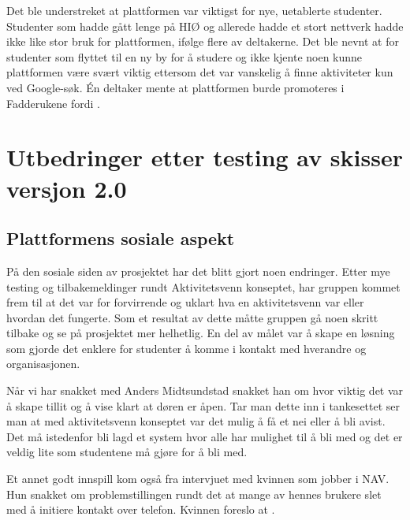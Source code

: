 Det ble understreket at plattformen var viktigst for nye, uetablerte studenter. Studenter som hadde gått lenge på HIØ og allerede hadde et stort nettverk hadde ikke like stor bruk for plattformen, ifølge flere av deltakerne. Det ble nevnt at for studenter som flyttet til en ny by for å studere og ikke kjente noen kunne plattformen være svært viktig ettersom det var vanskelig å finne aktiviteter kun ved Google-søk. Én deltaker mente at plattformen burde promoteres i Fadderukene fordi . 


\section{Utbedringer etter testing av skisser versjon 2.0}
\label{section:utbedringer-2.0}

\subsection{Plattformens sosiale aspekt}

På den sosiale siden av prosjektet har det blitt gjort noen endringer. Etter mye testing og tilbakemeldinger rundt Aktivitetsvenn konseptet, har gruppen kommet frem til at det var for forvirrende og uklart hva en aktivitetsvenn var eller hvordan det fungerte. Som et resultat av dette måtte gruppen gå noen skritt tilbake og se på prosjektet mer helhetlig. En del av målet var å  skape en løsning som gjorde det enklere for studenter å komme i kontakt med hverandre og organisasjonen. 

Når vi har snakket med Anders Midtsundstad snakket han om hvor viktig det var å skape tillit og å vise klart at døren er åpen. Tar man dette inn i tankesettet ser man at med aktivitetsvenn konseptet var det mulig å få et nei eller å bli avist. Det må istedenfor bli lagd et system hvor alle har mulighet til å bli med og det er veldig lite som studentene må gjøre for å bli med.

Et annet godt innspill kom også fra intervjuet med kvinnen som jobber i NAV. Hun snakket om problemstillingen rundt det at mange av hennes brukere slet med å initiere kontakt over telefon. Kvinnen foreslo at  \cite{NAV-INTERVJU:16}.

